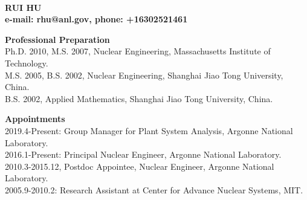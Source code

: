 \documentclass[11pt,letterpaper,english]{article}
\begin{document}
\setlength{\parindent}{0in} %

\pagestyle{fancy}   \renewcommand{%
\headrulewidth}{0.0pt}

\\
{\bf RUI HU}\\
{\bf e-mail: rhu@anl.gov, phone: +16302521461} \smallskip

\begin{flushleft} {\bf Professional Preparation}
{\parindent 16pt
   ~\\
   Ph.D. 2010, M.S. 2007, Nuclear Engineering, Massachusetts Institute of Technology. \\
   M.S. 2005, B.S. 2002, Nuclear Engineering, Shanghai Jiao Tong University, China. \\
   B.S. 2002, Applied Mathematics, Shanghai Jiao Tong University, China. \\
}

\vspace{.04in}
{\bf Appointments}
{\parindent 16pt
  ~\\
  2019.4-Present: Group Manager for Plant System Analysis, Argonne National Laboratory.\\
  2016.1-Present: Principal Nuclear Engineer, Argonne National Laboratory.\\
  2010.3-2015.12, Postdoc Appointee, Nuclear Engineer, Argonne National Laboratory.\\
  2005.9-2010.2: Research Assistant at Center for Advance Nuclear Systems, MIT.\\
}


\end{flushleft}
\end{document}
